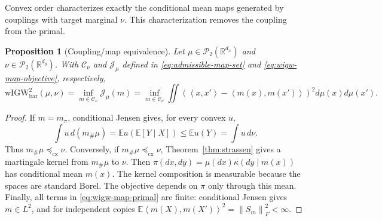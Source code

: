 \documentclass[11pt]{article}
\newcommand{\R}{\mathbb R}
\newcommand{\E}{\mathbb E}
\newcommand{\cP}{\mathcal P}
\newcommand{\ip}[2]{\left\langle #1,#2\right\rangle}
\newcommand{\norm}[1]{\left\lVert #1\right\rVert}
\newcommand{\cx}{\preceq_{\mathrm{cx}}}
\newcommand{\wIGW}{\mathrm{wIGW}_{\mathrm{bar}}}
\theoremstyle{plain}
\newtheorem{proposition}[theorem]{Proposition}
\theoremstyle{definition}
\theoremstyle{remark}
\newtheorem{remark}[theorem]{Remark}
\begin{document}
Convex order characterizes exactly the conditional mean maps generated by
couplings with target marginal $\nu$. This characterization removes the coupling
from the primal.

\begin{proposition}[Coupling/map equivalence]\label{prop:map}
Let $\mu\in\cP_2(\R^{d_x})$ and $\nu\in\cP_2(\R^{d_y})$. With
$\mathcal C_\nu$ and $\mathcal J_\mu$ defined in
\eqref{eq:admissible-map-set} and \eqref{eq:wigw-map-objective}, respectively,
\begin{equation}\label{eq:wigw-map-primal}
  \wIGW^2(\mu,\nu)
  =\inf_{m\in\mathcal C_\nu}\mathcal J_\mu(m)
  =\inf_{m\in\mathcal C_\nu}
  \iint\left(\ip{x}{x'}-\ip{m(x)}{m(x')}\right)^2d\mu(x)d\mu(x').
\end{equation}
\end{proposition}

\begin{proof}
If \(m=m_\pi\), conditional Jensen gives, for every convex \(u\),
\[
  \int u\,d(m_\#\mu)=\E u(\E[Y\mid X])\le\E u(Y)=\int u\,d\nu.
\]
Thus \(m_\#\mu\cx\nu\). Conversely, if \(m_\#\mu\cx\nu\),
Theorem~\ref{thm:strassen} gives a martingale kernel from \(m_\#\mu\) to \(\nu\).
Then \(\pi(dx,dy)=\mu(dx)\kappa(dy\mid m(x))\) has conditional mean \(m(x)\).
The kernel composition is measurable because the spaces are standard Borel. The
objective depends on \(\pi\) only through this mean. Finally, all terms in
\eqref{eq:wigw-map-primal}
are finite: conditional Jensen gives $m\in L^2$, and for independent copies
$\E\ip{m(X)}{m(X')}^2=\norm{S_m}_F^2<\infty$.
\end{proof}

\end{document}
